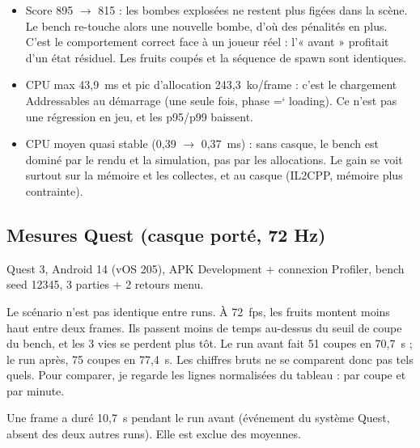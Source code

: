 \documentclass[11pt,a4paper]{article}
\renewcommand{\texttt}[1]{%
  {\ttfamily\hyphenchar\font=`\/ \hyphenpenalty=50 \exhyphenpenalty=50 #1}}
\begin{document}
\begin{itemize}
\item Score 895 $\rightarrow$ 815 : les bombes explosées ne restent plus figées dans
      la scène. Le bench re-touche alors une nouvelle bombe, d'où des pénalités en plus.
      C'est le comportement correct face à un joueur réel : l'« avant » profitait d'un
      état résiduel. Les fruits coupés et la séquence de spawn sont identiques.
\item CPU max 43,9~ms et pic d'allocation 243,3~ko/frame : c'est le chargement
      Addressables au démarrage (une seule fois, phase \texttt{loading}). Ce n'est pas
      une régression en jeu, et les p95/p99 baissent.
\item CPU moyen quasi stable (0,39 $\rightarrow$ 0,37~ms) : sans casque, le bench est
      dominé par le rendu et la simulation, pas par les allocations. Le gain se voit
      surtout sur la mémoire et les collectes, et au casque (IL2CPP, mémoire plus
      contrainte).
\end{itemize}

\subsection{Mesures Quest (casque porté, 72 Hz)}

Quest 3, Android 14 (vOS 205), APK Development + connexion Profiler, bench seed 12345,
3 parties + 2 retours menu.

Le scénario n'est pas identique entre runs. À 72~fps, les fruits montent moins haut
entre deux frames. Ils passent moins de temps au-dessus du seuil de coupe du bench, et
les 3 vies se perdent plus tôt. Le run avant fait 51 coupes en 70,7~s ; le run après,
75 coupes en 77,4~s. Les chiffres bruts ne se comparent donc pas tels quels. Pour comparer, je regarde
les lignes normalisées du tableau : par coupe et par minute.

Une frame a duré 10,7~s pendant le run avant (événement du système Quest, absent des
deux autres runs). Elle est exclue des moyennes.
\end{document}
